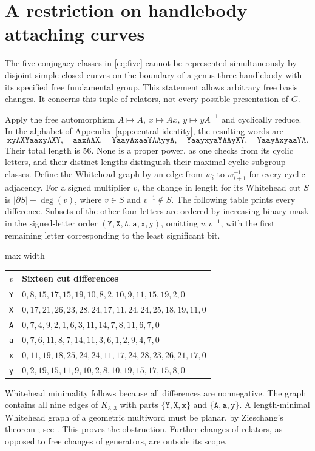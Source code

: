 \documentclass[11pt]{amsart}
\theoremstyle{definition}
\theoremstyle{remark}
\begin{document}
\section{A restriction on handlebody attaching curves}\label{app:whitehead}

The five conjugacy classes in \eqref{eq:five} cannot be represented
simultaneously by disjoint simple closed curves on the boundary of a
genus-three handlebody with its specified free fundamental group.
This statement allows arbitrary free basis changes. It concerns this
tuple of relators, not every possible presentation of $G$.

Apply the free automorphism $A\mapsto A$, $x\mapsto Ax$,
$y\mapsto yA^{-1}$ and cyclically reduce. In the alphabet of
Appendix~\ref{app:central-identity}, the resulting words are
\[
 \texttt{xyAXYaaxyAXY},\quad \texttt{aaxAAX},\quad
 \texttt{YaayAxaaYAAyyA},\quad \texttt{YaayxyaYAAyXY},\quad
 \texttt{YaayAxyaaYA}.
\]
Their total length is $56$. None is a proper power, as one checks
from its cyclic letters, and their distinct lengths distinguish their
maximal cyclic-subgroup classes. Define the Whitehead graph by an edge
from $w_i$ to $w_{i+1}^{-1}$ for every cyclic adjacency. For a signed
multiplier $v$, the change in length for its Whitehead cut $S$ is
$|\partial S|-\deg(v)$, where $v\in S$ and $v^{-1}\notin S$.
The following table prints every difference. Subsets of the other four
letters are ordered by increasing binary mask in the signed-letter
order $(\texttt{Y},\texttt{X},\texttt{A},\texttt{a},\texttt{x},\texttt{y})$,
omitting $v,v^{-1}$, with the first remaining letter corresponding
to the least significant bit.
\begin{center}
\begin{adjustbox}{max width=\textwidth}
\begin{tabular}{cl}
\toprule
$v$&Sixteen cut differences\\\midrule
\texttt{Y}&$0,8,15,17,15,19,10,8,2,10,9,11,15,19,2,0$\\
\texttt{X}&$0,17,21,26,23,28,24,17,11,24,24,25,18,19,11,0$\\
\texttt{A}&$0,7,4,9,2,1,6,3,11,14,7,8,11,6,7,0$\\
\texttt{a}&$0,7,6,11,8,7,14,11,3,6,1,2,9,4,7,0$\\
\texttt{x}&$0,11,19,18,25,24,24,11,17,24,28,23,26,21,17,0$\\
\texttt{y}&$0,2,19,15,11,9,10,2,8,10,19,15,17,15,8,0$\\\bottomrule
\end{tabular}
\end{adjustbox}
\end{center}
Whitehead minimality follows because all differences are nonnegative.
The graph contains all nine edges of $K_{3,3}$ with parts
$\{\texttt{Y},\texttt{X},\texttt{x}\}$ and
$\{\texttt{A},\texttt{a},\texttt{y}\}$. A length-minimal
Whitehead graph of a geometric multiword must be planar, by
Zieschang's theorem \cite{Zie65}; see
\cite[Section 2E1 and the discussion following Proposition 5.2]{Cas16}.
This proves the obstruction. Further changes of relators, as opposed
to free changes of generators, are outside its scope.
\end{document}
